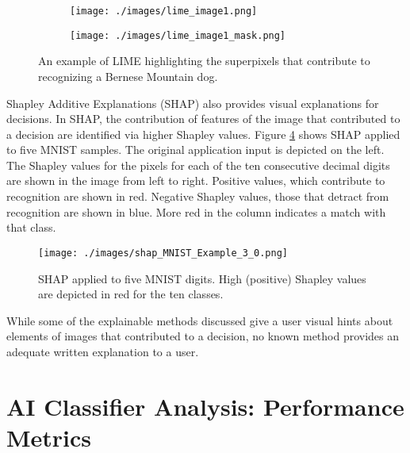 \begin{figure}[H]
    \centering

    \begin{subfigure}{.40\columnwidth}
        \centering
        \texttt{[image: ./images/lime\_image1.png]}
        \caption{}
        \label{fig:lime_ex1}
    \end{subfigure}%
    \begin{subfigure}{.40\columnwidth}
        \centering
        \texttt{[image: ./images/lime\_image1\_mask.png]}
        \caption{}
        \label{fig:lime_ex1_mask}
    \end{subfigure}%

    \caption{An example of LIME highlighting the superpixels that contribute to recognizing a Bernese Mountain dog\cite{lime_github}.}
    \label{fig:lime_mask}
\end{figure}

Shapley Additive Explanations (SHAP) also provides visual explanations for
decisions. In SHAP, the contribution of features of the image that contributed
to a decision are identified via higher Shapley values. Figure
\ref{fig:shap_mnist} shows SHAP applied to five MNIST samples.  The original
application input is depicted on the left. The Shapley values for the pixels for
each of the ten consecutive decimal digits are shown in the image from left to
right.  Positive values, which contribute to recognition are shown in red.
Negative Shapley values, those that detract from recognition are shown in blue.
More red in the column indicates a match with that
class\cite{lundberg2017unified}.

\begin{figure}[h]
    \centering
    \texttt{[image: ./images/shap\_MNIST\_Example\_3\_0.png]}
    \caption{SHAP applied to five MNIST digits. High (positive) Shapley values are depicted in red for the ten classes\cite{shap_docs}.}
    \label{fig:shap_mnist}
\end{figure}

While some of the explainable methods discussed give a user visual hints about
elements of images that contributed to a decision, no known method provides an
adequate written explanation to a user.

\section{AI Classifier Analysis: Performance Metrics}
\label{sec:perf_metrics}

